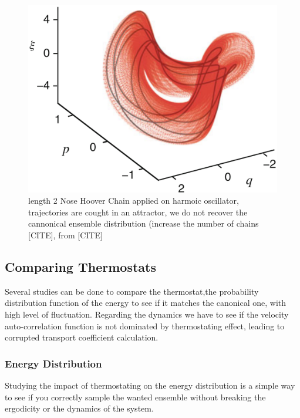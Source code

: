 \documentclass[ansiapaper]{report}
\begin{document}
\begin{multicols}{3}
\begin{figure}[H]
    \begin{center}
        \includegraphics[width=1\linewidth]{./figures/NoseHooverChain.png}
    \end{center}
    \caption{length 2 Nose Hoover Chain applied on harmoic oscillator, trajectories are cought in an attractor, we do not recover the cannonical ensemble distribution (increase the number of chains [CITE], from [CITE]}\label{fig:NH-chain}
\end{figure}

\subsection{Comparing Thermostats}
Several studies can be done to compare the thermostat,the probability distribution function of the energy to see if it matches the canonical one, with high level of fluctuation. Regarding the dynamics we have to see if the velocity auto-correlation function is not dominated by thermostating effect, leading to corrupted transport coefficient calculation. 
\subsubsection{Energy Distribution}
Studying the impact of thermostating on the energy distribution is a simple way to see if you correctly sample the wanted ensemble without breaking the ergodicity or the dynamics of the system. 


\end{multicols}
\end{document}
